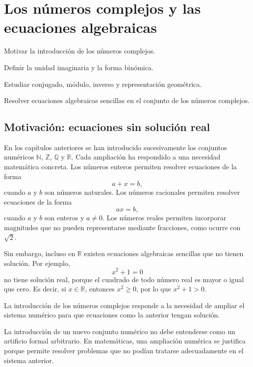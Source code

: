 \chapter{Los números complejos y las ecuaciones algebraicas}

\begin{objetivos}
  \item Motivar la introducción de los números complejos.
  \item Definir la unidad imaginaria y la forma binómica.
  \item Estudiar conjugado, módulo, inverso y representación geométrica.
  \item Resolver ecuaciones algebraicas sencillas en el conjunto de los números complejos.
\end{objetivos}

\section{Motivación: ecuaciones sin solución real}

En los capítulos anteriores se han introducido sucesivamente los conjuntos numéricos
\(\mathbb{N}\), \(\mathbb{Z}\), \(\mathbb{Q}\) y \(\mathbb{R}\). Cada ampliación ha respondido a una necesidad matemática concreta. Los números enteros permiten resolver ecuaciones de la forma
\[
  a+x=b,
\]
cuando \(a\) y \(b\) son números naturales. Los números racionales permiten resolver ecuaciones de la forma
\[
  ax=b,
\]
cuando \(a\) y \(b\) son enteros y \(a\neq 0\). Los números reales permiten incorporar magnitudes que no pueden representarse mediante fracciones, como ocurre con \(\sqrt{2}\).

Sin embargo, incluso en \(\mathbb{R}\) existen ecuaciones algebraicas sencillas que no tienen solución. Por ejemplo,
\[
  x^2+1=0
\]
no tiene solución real, porque el cuadrado de todo número real es mayor o igual que cero. Es decir, si \(x\in\mathbb{R}\), entonces \(x^2\geq 0\), por lo que \(x^2+1>0\).

La introducción de los números complejos responde a la necesidad de ampliar el sistema numérico para que ecuaciones como la anterior tengan solución.

\begin{advertencia}
La introducción de un nuevo conjunto numérico no debe entenderse como un artificio formal arbitrario. En matemáticas, una ampliación numérica se justifica porque permite resolver problemas que no podían tratarse adecuadamente en el sistema anterior.
\end{advertencia}

